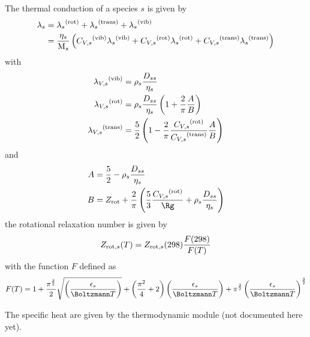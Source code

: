 The thermal conduction of a species $s$ is given by
\begin{equation}
\begin{split}
\thermcond[s] & = \thermcond[s]^{(\text{rot})} + \thermcond[s]^{(\text{trans})} + \thermcond[s]^{(\text{vib})} \\
              & = \frac{\vis[s]}{\Mm[s]} \left(
                        \foreach \signe/\mode in {/vib,+/rot,+/trans}
                                {\signe \specificHeat[\Vol,s]^{(\text{\mode})}\thermcond[s]^{(\text{\mode})}}
                                          \right)
\end{split}
\label{transport:therm_cond}
\end{equation}
with
\begin{equation}
\begin{split}
\thermcond[\Vol,s]^{(\text{vib})}   & = \mass[s] \frac{\diff[s s]}{\vis[s]} \\
\thermcond[\Vol,s]^{(\text{rot})}   & = \mass[s] \frac{\diff[s s]}{\vis[s]}\left(1 + \frac{2}{\pi}\frac{A}{B}\right) \\
\thermcond[\Vol,s]^{(\text{trans})} & = \frac{5}{2} \left(1 - \frac{2}{\pi}\frac{\specificHeat[\Vol,s]^{(\text{rot})}}{\specificHeat[\Vol,s]^{(\text{trans})}}\frac{A}{B}\right)
\end{split}
\label{thermal_cond:modes}
\end{equation}
and
\begin{equation}
\begin{split}
  A & = \frac{5}{2} - \mass[s] \frac{\diff[s s]}{\vis[s]} \\
  B & = \rotRelax + \frac{2}{\pi} \left(\frac{5}{3}\frac{\specificHeat[\Vol,s]^{(\text{rot})}}{\Rg} + \mass[s] \frac{\diff[s s]}{\vis[s]}\right)
\end{split}
\label{thermal_cond:A_B}
\end{equation}
the rotational relaxation number is given by
\begin{equation}
\rotRelax[,s](\Temp) = \rotRelax[,s](298)\frac{F(298)}{F(\Temp)}
\label{thermal_cond:Zrot}
\end{equation}
with the function $F$ defined as
\begin{equation}
F(T) = 1 + \frac{\pi^{\frac{3}{2}}}{2}\sqrt{\left(\frac{\LJdepth[s]}{\Boltzmann\Temp}\right)}
         + \left(\frac{\pi^2}{4} + 2\right)\left(\frac{\LJdepth[s]}{\Boltzmann\Temp}\right)
         + \pi^{\frac{3}{2}}\left(\frac{\LJdepth[s]}{\Boltzmann\Temp}\right)^{\frac{3}{2}}
\label{therm_cond:F}
\end{equation}

The specific heat are given by the thermodynamic module (not documented here yet).

